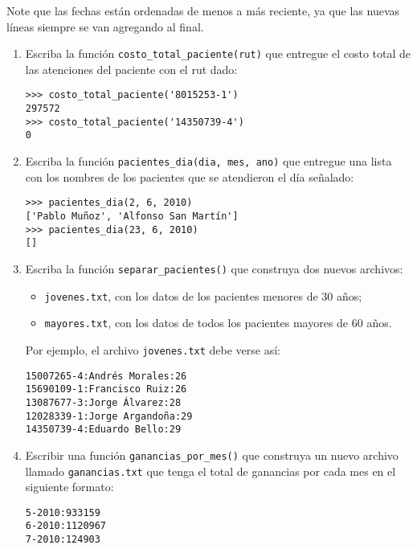 Note que las fechas están ordenadas de menos a más reciente, ya que las
nuevas líneas siempre se van agregando al final.

\begin{enumerate}[1.]
\item
  Escriba la función \lstinline!costo_total_paciente(rut)! que entregue
  el costo total de las atenciones del paciente con el rut dado:

\begin{lstlisting}
>>> costo_total_paciente('8015253-1')
297572
>>> costo_total_paciente('14350739-4')
0
\end{lstlisting}
\item
  Escriba la función \lstinline!pacientes_dia(dia, mes, ano)! que
  entregue una lista con los nombres de los pacientes que se atendieron
  el día señalado:

\begin{lstlisting}
>>> pacientes_dia(2, 6, 2010)
['Pablo Muñoz', 'Alfonso San Martín']
>>> pacientes_dia(23, 6, 2010)
[]
\end{lstlisting}
\item
  Escriba la función \lstinline!separar_pacientes()! que construya dos
  nuevos archivos:

  \begin{itemize}
  \item
    \lstinline!jovenes.txt!, con los datos de los pacientes menores de
    30 años;
  \item
    \lstinline!mayores.txt!, con los datos de todos los pacientes
    mayores de 60 años.
  \end{itemize}

  Por ejemplo, el archivo \lstinline!jovenes.txt! debe verse así:

\begin{lstlisting}
15007265-4:Andrés Morales:26
15690109-1:Francisco Ruiz:26
13087677-3:Jorge Álvarez:28
12028339-1:Jorge Argandoña:29
14350739-4:Eduardo Bello:29
\end{lstlisting}
\item
  Escribir una función \lstinline!ganancias_por_mes()! que construya un
  nuevo archivo llamado \lstinline!ganancias.txt! que tenga el total de
  ganancias por cada mes en el siguiente formato:

\begin{lstlisting}
5-2010:933159
6-2010:1120967
7-2010:124903
\end{lstlisting}
\end{enumerate}
